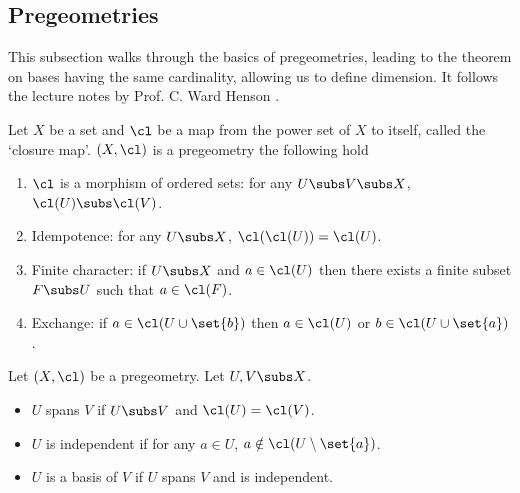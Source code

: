 \subsection{Pregeometries}
This subsection walks through the basics of pregeometries,
leading to the theorem on bases having the same cardinality, 
allowing us to define dimension.
It follows the lecture notes by Prof. C. Ward Henson \cite{henson}.

\begin{dfn}[Pregeometry]
    Let $X$ be a set and $\cl$ be a map from the power set of $X$ to itself,
    called the `closure map'.
    $(X,\cl)$ is a pregeometry the following hold
    \begin{enumerate}
        \item $\cl$ is a morphism of ordered sets: 
            for any $U \subs V \subs X$, $\cl(U) \subs \cl(V)$.
        \item Idempotence: for any $U \subs X$, $\cl(\cl(U)) = \cl(U)$.
        \item Finite character: if $U \subs X$ and $a \in \cl(U)$ then 
            there exists a finite subset $F \subs U$ such that $a \in \cl(F)$.
        \item Exchange: if $a \in \cl(U \cup \set{b})$
            then $a \in \cl(U)$ or $b \in \cl(U \cup \set{a})$.
    \end{enumerate}
\end{dfn}

\begin{dfn}
    Let $(X,\cl)$ be a pregeometry.
    Let $U,V \subs X$.
    \begin{itemize}
        \item $U$ spans $V$ if $U \subs V$ and $\cl(U) = \cl(V)$.
        \item $U$ is independent if for any $a \in U$, 
            $a \notin \cl(U \setminus \set{a})$.
        \item $U$ is a basis of $V$ if $U$ spans $V$ and is independent.
    \end{itemize}
\end{dfn}

